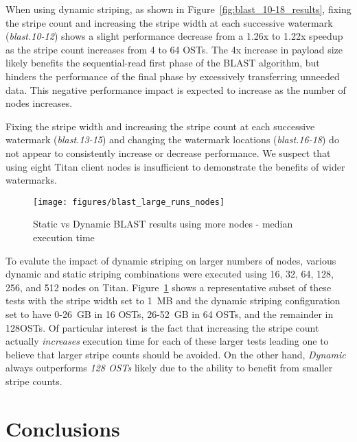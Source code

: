 \documentclass[conference,compsoc]{IEEEtran}
\begin{document}
When using dynamic striping, as shown in Figure~\ref{fig:blast_10-18_results}, fixing the stripe count and increasing the stripe width at each successive watermark (\emph{blast.10-12}) shows a slight performance decrease from a 1.26x to 1.22x speedup as the stripe count increases from 4 to 64 OSTs. The 4x increase in payload size likely benefits the sequential-read first phase of the BLAST algorithm, but hinders the performance of the final phase by excessively transferring unneeded data. This negative performance impact is expected to increase as the number of nodes increases.

Fixing the stripe width and increasing the stripe count at each successive watermark (\emph{blast.13-15}) and changing the watermark locations (\emph{blast.16-18}) do not appear to consistently increase or decrease performance. We suspect that using eight Titan client nodes is insufficient to demonstrate the benefits of wider watermarks.

\begin{figure}[t]
\centering
  \texttt{[image: figures/blast\_large\_runs\_nodes]}
\caption{Static vs Dynamic BLAST results using more nodes - median execution time}
\label{fig:blast_all_big_results}
\end{figure}

To evalute the impact of dynamic striping on larger numbers of nodes, various dynamic and static striping combinations were executed using 16, 32, 64, 128, 256, and 512 nodes on Titan. Figure~\ref{fig:blast_all_big_results} shows a representative subset of these tests with the stripe width set to 1~MB and the dynamic striping configuration set to have 0-26~GB in 16 OSTs, 26-52~GB in 64 OSTs, and the remainder in 128OSTs. Of particular interest is the fact that increasing the stripe count actually \emph{increases} execution time for each of these larger tests leading one to believe that larger stripe counts should be avoided. On the other hand, \emph{Dynamic} always outperforms \emph{128 OSTs} likely due to the ability to benefit from smaller stripe counts.

\section{Conclusions}
\end{document}
